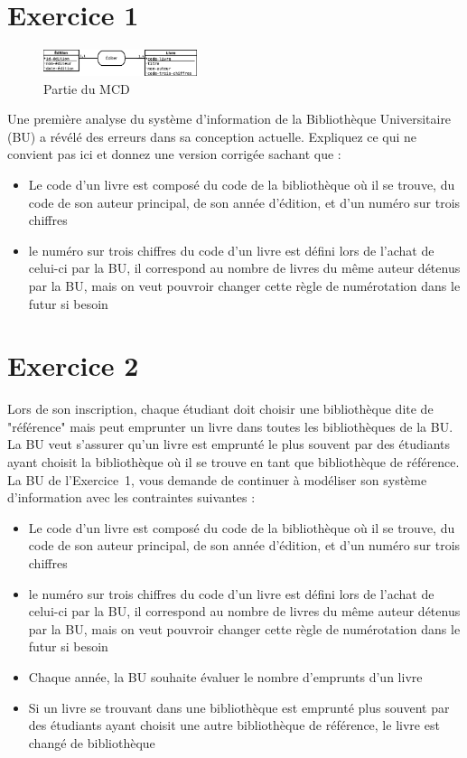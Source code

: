 \section*{Exercice 1}
\begin{figure}
    \begin{center}
    \includegraphics[width=0.4\textwidth]{images/partie_mcd.eps} 
    \caption{\label{mcd} Partie du MCD}
    \end{center}
\end{figure}
Une première analyse du système d'information de la Bibliothèque Universitaire (BU) a révélé des erreurs dans sa conception actuelle. Expliquez ce qui ne convient pas ici et donnez une version corrigée sachant que : 
\begin{itemize}
    \item Le code d'un livre est composé du code de la bibliothèque où il se trouve, du code de son auteur principal, de son année d'édition, et d'un numéro sur trois chiffres 
    \item le numéro sur trois chiffres du code d'un livre est défini lors de l'achat de celui-ci par la BU, il correspond au nombre de livres du même auteur détenus par la BU, mais on veut pouvroir changer cette règle de numérotation dans le futur si besoin
\end{itemize}

\section*{Exercice 2}
Lors de son inscription, chaque étudiant doit choisir une bibliothèque dite de "référence" mais peut emprunter un livre dans toutes les bibliothèques de la BU\@. La BU veut s'assurer qu'un livre est emprunté le plus souvent par des étudiants ayant choisit la bibliothèque où il se trouve en tant que bibliothèque de référence. 
La BU de l'Exercice~1, vous demande de continuer à modéliser son système d'information avec les contraintes suivantes : 
\begin{itemize}
    \item Le code d'un livre est composé du code de la bibliothèque où il se trouve, du code de son auteur principal, de son année d'édition, et d'un numéro sur trois chiffres 
    \item le numéro sur trois chiffres du code d'un livre est défini lors de l'achat de celui-ci par la BU, il correspond au nombre de livres du même auteur détenus par la BU, mais on veut pouvroir changer cette règle de numérotation dans le futur si besoin
    \item Chaque année, la BU souhaite évaluer le nombre d'emprunts d'un livre 
    \item Si un livre se trouvant dans une bibliothèque est emprunté plus souvent par des étudiants ayant choisit une autre bibliothèque de référence, le livre est changé de bibliothèque
\end{itemize}

